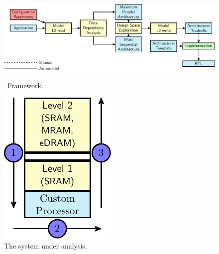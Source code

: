 \begin{figure}[ht]
\begin{minipage}{.7\textwidth}
\includegraphics[width=.9\textwidth,left]{images/framework.pdf}
  \caption{\small \frameworkname~Framework.}{}
  \label{fig:framework}
\end{minipage}%
\begin{minipage}{.3\textwidth}
    \centering
\includegraphics[width=.5\textwidth]{images/architecture.pdf}
\caption{\small The system under analysis. 
    }
\label{fig:system}
\end{minipage}
\end{figure}
